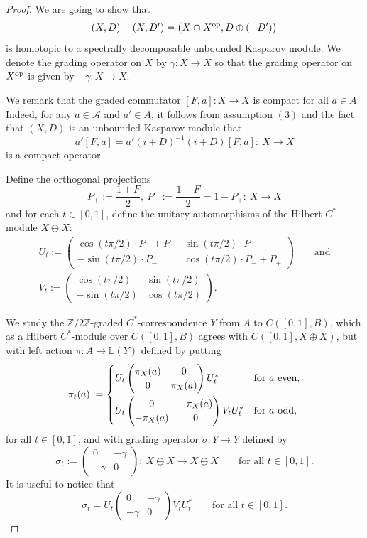 \documentclass[pdftex]{sigma}
\numberwithin{equation}{section}
\newcommand{\cd}{\cdot}
\newcommand{\op}{\oplus}
\newcommand{\zz}{\mathbb{Z}}
\newcommand{\ga}{\gamma}
\newcommand{\si}{\sigma}
\newcommand{\s}[1]{\mathscr{#1}}
\newcommand{\B}[1]{\mathbb{#1}}
\begin{document}
\begin{proof}
We are going to show that
\[
(X,D) - (X, D') = \big(X \op X^{{\rm op}}, D \op (- D') \big)
\]
is homotopic to a spectrally decomposable unbounded Kasparov module. We denote the grading operator on $X$ by $\ga\colon X \to X$ so that the grading operator on $X^{{\rm op}}$ is given by $-\ga\colon X \to X$.

We remark that the graded commutator $[F,a]\colon X \to X$ is compact for all $a \in A$. Indeed, for any $a \in \s A$ and $a' \in A$, it follows from assumption $(3)$ and the fact that $(X,D)$ is an unbounded Kasparov module that
\[
a' [F,a] = a' (i + D)^{-1} (i + D) [F,a]\colon \ X \to X
\]
is a compact operator.

Define the orthogonal projections
\[
P_+ := \frac{1 + F}{2} , \ P_- := \frac{1 - F}{2} = 1 - P_+\colon \ X \to X
\]
and for each $t \in [0,1]$, define the unitary automorphisms of the Hilbert $C^*$-module $X \op X$:
\begin{gather}
U_t := \left(\begin{matrix} \cos(t \pi/ 2) \cd P_- + P_+ & \sin(t \pi/2) \cd P_- \\ - \sin(t \pi/2) \cd P_- & \cos(t \pi/2) \cd P_- + P_+\end{matrix}\right) \qquad \text{and} \nonumber\\
V_t := \left(\begin{matrix} \cos(t \pi/ 2) & \sin(t \pi/2) \\ - \sin(t \pi/2) & \cos(t \pi/2) \end{matrix}\right) .\label{eq:unitary}
\end{gather}

We study the $\zz/2\zz$-graded $C^*$-correspondence $Y$ from $A$ to $C([0,1],B)$, which as a Hilbert $C^*$-module over $C([0,1],B)$ agrees with $C( [0,1],X \op X)$, but with left action $\pi\colon A \to \B L(Y)$ defined by putting
\[
\pi_t(a) := \begin{cases} U_t \left(\begin{matrix}\pi_X(a) & 0 \\ 0 & \pi_X(a)\end{matrix}\right) U_t^* & \text{for} \ a \text{ even}, \vspace{1mm}\\
U_t \left(\begin{matrix}0 & -\pi_X(a) \\ -\pi_X(a) & 0\end{matrix}\right) V_t U_t^*
& \text{for} \ a \text{ odd} ,\end{cases}
\]
for all $t \in [0,1]$, and with grading operator $\si\colon Y \to Y$ defined by
\[
\si_t := \left(\begin{matrix} 0 & - \ga \\ - \ga & 0\end{matrix}\right) \colon \ X \op X \to X \op X \qquad \text{for all } t \in [0,1] .
\]
It is useful to notice that
\[
\si_t = U_t \left(\begin{matrix} 0 & - \ga \\ -\ga & 0\end{matrix}\right) V_t U_t^* \qquad \text{for all } t \in [0,1] .
\]


\end{proof}
\end{document}

